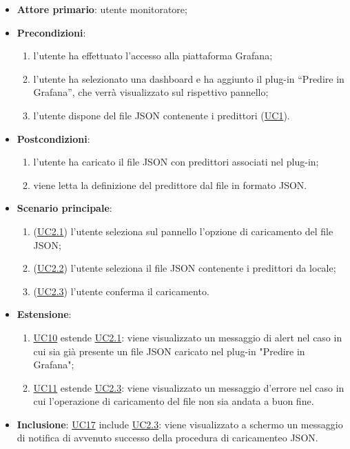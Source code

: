 		\begin{itemize}
			\item\textbf{Attore primario}: utente monitoratore;
			\item\textbf{Precondizioni}: 
				\begin{enumerate}
					\item l’utente ha effettuato l’accesso alla piattaforma Grafana;
					\item l’utente ha selezionato una dashboard e ha aggiunto il plug-in “Predire in Grafana”,  che verrà visualizzato sul rispettivo pannello;
					\item l’utente dispone del file JSON contenente i predittori (\hyperref[par:UC1]{UC1}). 
				\end{enumerate}
			\item\textbf{Postcondizioni}:
				\begin{enumerate}
					\item l’utente ha caricato il file JSON con predittori associati nel plug-in;
					\item viene letta la definizione del predittore dal file in formato JSON. 
				\end{enumerate}
			\item\textbf{Scenario principale}:
				\begin{enumerate}
					\item (\hyperref[par:UC2.1]{UC2.1}) l'utente seleziona sul pannello l’opzione di caricamento del file JSON; 
					\item (\hyperref[par:UC2.2]{UC2.2}) l’utente seleziona il file JSON contenente i predittori da locale;
					\item (\hyperref[par:UC2.3]{UC2.3}) l'utente conferma il caricamento.
				\end{enumerate}
			\item\textbf{Estensione}:
				\begin{enumerate} 
					\item\hyperref[par:UC10]{UC10} estende \hyperref[par:UC2.1]{UC2.1}: viene visualizzato un messaggio di alert nel caso in cui sia già presente un file JSON caricato nel plug-in "Predire in Grafana";
					\item\hyperref[par:UC11]{UC11} estende \hyperref[par:UC2.3]{UC2.3}: viene visualizzato un messaggio d’errore nel caso in cui l’operazione di caricamento del file non sia andata a buon fine.
				\end{enumerate}	
			\item\textbf{Inclusione}: \hyperref[par:UC17]{UC17} include \hyperref[par:UC2.3]{UC2.3}: viene visualizzato a schermo un messaggio di notifica di avvenuto successo della procedura di caricamenteo JSON.
		\end{itemize}
		
